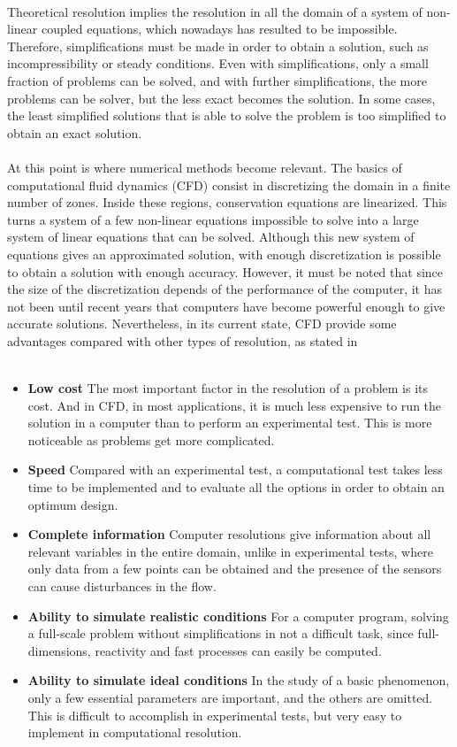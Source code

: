 \\
Theoretical resolution implies the resolution in all the domain of a system of non-linear coupled equations, which nowadays has resulted to be impossible. Therefore, simplifications must be made in order to obtain a solution, such as incompressibility or steady conditions. Even with simplifications, only a small fraction of problems can be solved, and with further simplifications, the more problems can be solver, but the less exact becomes the solution. In some cases, the least simplified solutions that is able to solve the problem is too simplified to obtain an exact solution.\\
\\
At this point is where numerical methods become relevant. The basics of computational fluid dynamics (CFD) consist in discretizing the domain in a finite number of zones. Inside these regions, conservation equations are linearized. This turns a system of a few non-linear equations impossible to solve into a large system of linear equations that can be solved. Although this new system of equations gives an approximated solution, with enough discretization is possible to obtain a solution with enough accuracy. However, it must be noted that since the size of the discretization depends of the performance of the computer, it has not been until recent years that computers have become powerful enough to give accurate solutions. Nevertheless, in its current state, CFD provide some advantages compared with other types of resolution, as stated in \cite{Patankar}\\
\\
\begin{itemize}
\item \textbf{Low cost} The most important factor in the resolution of a problem is its cost. And in CFD, in most applications, it is much less expensive to run the solution in a computer than to perform an experimental test. This is more noticeable as problems get more complicated.
\item \textbf{Speed} Compared with an experimental test, a computational test takes less time to be implemented and to evaluate all the options in order to obtain an optimum design.
\item \textbf{Complete information} Computer resolutions give information about all relevant variables in the entire domain, unlike in experimental tests, where only data from a few points can be obtained and the presence of the sensors can cause disturbances in the flow.
\item \textbf{Ability to simulate realistic conditions} For a computer program, solving a full-scale problem without simplifications in not a difficult task, since full-dimensions, reactivity and fast processes can easily be computed.
\item \textbf{Ability to simulate ideal conditions} In the study of a basic phenomenon, only a few essential parameters are important, and the others are omitted. This is difficult to accomplish in experimental tests, but very easy to implement in computational resolution.
\end{itemize}
